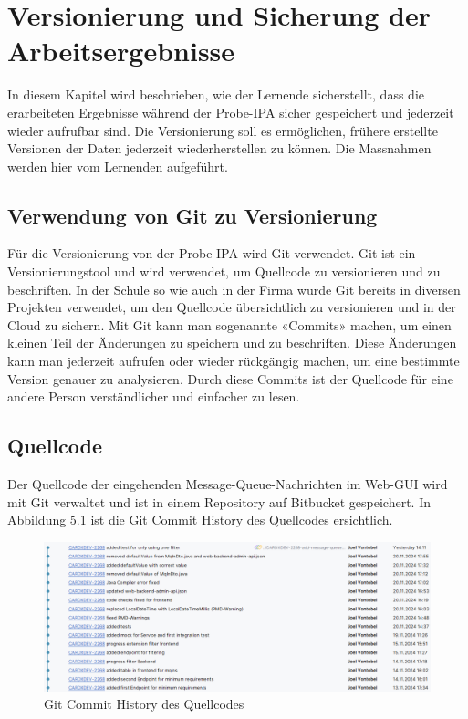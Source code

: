 \chapter{Versionierung und Sicherung der Arbeitsergebnisse}\label{ch:versionierung-und-sicherung-der-arbeitsergebnisse}
In diesem Kapitel wird beschrieben, wie der Lernende sicherstellt, dass die erarbeiteten Ergebnisse während der Probe-IPA sicher gespeichert und jederzeit wieder aufrufbar sind. Die Versionierung soll es ermöglichen, frühere erstellte Versionen der Daten jederzeit wiederherstellen zu können. Die Massnahmen werden hier vom Lernenden aufgeführt.

\section{Verwendung von Git zu Versionierung}
Für die Versionierung von der Probe-IPA wird Git verwendet. Git ist ein Versionierungstool und wird verwendet, um Quellcode zu versionieren und zu beschriften. In der Schule so wie auch in der Firma wurde Git bereits in diversen Projekten verwendet, um den Quellcode übersichtlich zu versionieren und in der Cloud zu sichern. Mit Git kann man sogenannte «Commits» machen, um einen kleinen Teil der Änderungen zu speichern und zu beschriften. Diese Änderungen kann man jederzeit aufrufen oder wieder rückgängig machen, um eine bestimmte Version genauer zu analysieren. Durch diese Commits ist der Quellcode für eine andere Person verständlicher und einfacher zu lesen.

\section{Quellcode}
Der Quellcode der eingehenden Message-Queue-Nachrichten im Web-GUI wird mit Git verwaltet und ist in einem Repository auf Bitbucket gespeichert. In Abbildung 5.1 ist die Git Commit History des Quellcodes ersichtlich.

\begin{figure}[H]
	\begin{center}
		\includegraphics[width=1\textwidth]{ressourcen/commit-log-implementierung}
		\caption[Git Commit History des Quellcodes]{Git Commit History des Quellcodes}\label{fig:Git-Commit-History-des-Quellcodes}
	\end{center}
\end{figure}

